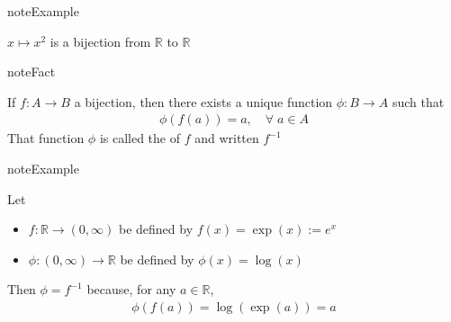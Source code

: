 \documentclass[letterpaper,10pt,english]{jupyterBook}
\begin{document}
\begin{sphinxadmonition}{note}{Example}

\sphinxAtStartPar
\(x \mapsto x^2\) is  a bijection from \(\mathbb{R}\) to \(\mathbb{R}
\)
\end{sphinxadmonition}

\begin{figure}[htbp]
\centering

\noindent{}
\end{figure}

\begin{sphinxadmonition}{note}{Fact}

\sphinxAtStartPar
If \(f \colon A \to B\) a bijection, then there exists a unique
function \(\phi \colon B \to A\) such that
\begin{equation*}
\begin{split}
\phi(f(a)) = a, \quad \forall \; a \in A
\end{split}
\end{equation*}
\sphinxAtStartPar
That function \(\phi\) is called the  of \(f\) and written \(f^{-1}\)
\end{sphinxadmonition}

\begin{figure}[htbp]
\centering

\noindent{}
\end{figure}

\begin{sphinxadmonition}{note}{Example}

\sphinxAtStartPar
Let
\begin{itemize}
\item {} 
\sphinxAtStartPar
\(f \colon \mathbb{R} \to (0, \infty)\) be defined by \(f(x) = \exp(x) :=
e^x\)

\item {} 
\sphinxAtStartPar
\(\phi \colon (0, \infty) \to \mathbb{R}\) be defined by \(\phi(x) = \log(x)\)

\end{itemize}

\sphinxAtStartPar
Then \(\phi = f^{-1}\) because, for any \(a \in \mathbb{R}\),
\begin{equation*}
\begin{split}
\phi(f(a)) = \log(\exp(a)) = a
\end{split}
\end{equation*}\end{sphinxadmonition}
\end{document}
